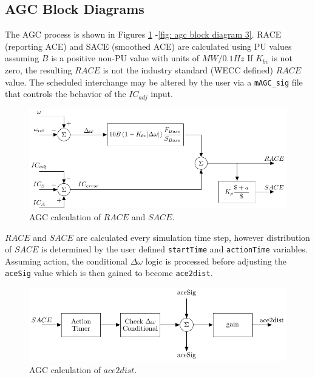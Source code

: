 \subsection{AGC Block Diagrams}
The AGC process is shown in Figures \ref{fig: agc block diagram 1} -\ref{fig: agc block diagram 3}.
RACE (reporting ACE) and SACE (smoothed ACE) are calculated using PU values assuming $B$ is a positive non-PU value with units of $MW/0.1Hz$
If $K_{bv}$ is not zero, the resulting $RACE$ is not the industry standard (WECC defined) $RACE$ value.
The scheduled interchange may be altered by the user via a \verb|mAGC_sig| file that controls the behavior of the $IC_{adj}$ input.


\begin{figure}[!h]
	\centering
	\footnotesize
	\includegraphics[width=\linewidth]{sections/agc/200722-AGCblockdiagram-p1}
	\caption{AGC calculation of $RACE$ and $SACE$.}
	\label{fig: agc block diagram 1}
\end{figure}%

\pagebreak
$RACE$ and $SACE$ are calculated every simulation time step, however
distribution of $SACE$ is determined by the user defined \verb|startTime| and \verb|actionTime| variables.
Assuming action, the conditional $\Delta\omega$ logic is processed before adjusting the \verb|aceSig| value which is then gained to become \verb|ace2dist|.

\begin{figure}[!h]
	\centering
	\footnotesize
	\includegraphics[width=\linewidth]{sections/agc/200722-AGCblockdiagram-p2}
	\caption{AGC calculation of $ace2dist$.}
	\label{fig: agc block diagram 2}
\end{figure}%

